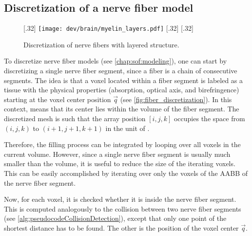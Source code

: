 \subsection{Discretization of a nerve fiber model}
%
\begin{figure}[!t]
\centering
\setlength{\tikzwidth}{0.32\textwidth}
[.32\textwidth]{
\texttt{[image: dev/brain/myelin\_layers.pdf]}\vspace{0mm}}\hfill
{}[.32\textwidth]{
\vspace{-5mm}}\hfill
{}[.32\textwidth]{
\vspace{-5mm}}
\caption{Discretization of nerve fibers with layered structure.}
\label{fig:fiber_discretisation}
\end{figure}
%
To discretize nerve fiber models (see \cref{chap:sof:modeling}), one can start by discretizing a single nerve fiber segment, since a fiber is a chain of consecutive segments.
The idea is that a voxel located within a fiber segment is labeled as a tissue with the physical properties (absorption, optical axis, and birefringence) starting at the voxel center position $\vec{q}$ (see \cref{fig:fiber_discretization}).
In this context,  means that its center lies within the volume of the fiber segment.
The discretized mesh is such that the array position $[i,j,k]$ occupies the space from $(i,j,k)$ to $(i+1,j+1,k+1)$ in the unit of \Voxelsize{}.
\par
%
Therefore, the filling process can be integrated by looping over all voxels in the current volume.
However, since a single nerve fiber segment is usually much smaller than the volume, it is useful to reduce the size of the iterating voxels.
This can be easily accomplished by iterating over only the voxels of the \ac{AABB} of the nerve fiber segment.
\par
%
Now, for each voxel, it is checked whether it is inside the nerve fiber segment.
This is computed analogously to the collision between two nerve fiber segments (see \cref{alg:pseudocodeCollisionDetection}), except that only one point of the shortest distance has to be found.
The other is the position of the voxel center $\vec{q}$.
